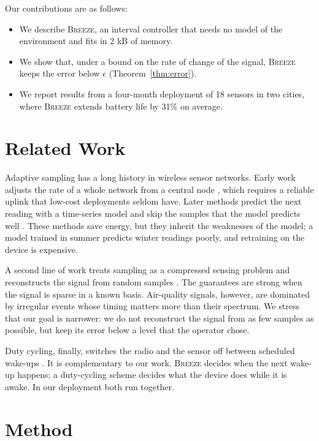 \documentclass{article}
\newcommand{\sys}{\textsc{Breeze}\xspace}
\begin{document}
Our contributions are as follows:
\begin{itemize}
  \item We describe \sys, an interval controller that needs no model of the environment and fits in
  2 kB of memory.
  \item We show that, under a bound on the rate of change of the signal, \sys keeps the error below
  $\epsilon$ (Theorem~\ref{thm:error}).
  \item We report results from a four-month deployment of 18 sensors in two cities, where \sys extends
  battery life by 31\% on average.
\end{itemize}

\section{Related Work}

Adaptive sampling has a long history in wireless sensor networks. Early work
adjusts the rate of a whole network from a central node
\citep{jain2004adaptive}, which requires a reliable uplink that low-cost
deployments seldom have. Later methods predict the next reading with a
time-series model and skip the samples that the model predicts well
\citep{alippi2010adaptive,silva2017adaptive}. These methods save energy, but
they inherit the weaknesses of the model; a model trained in summer predicts
winter readings poorly, and retraining on the device is expensive.

A second line of work treats sampling as a compressed sensing problem and
reconstructs the signal from random samples \citep{chen2012compressed}. The
guarantees are strong when the signal is sparse in a known basis.
Air-quality signals, however, are dominated by irregular events whose timing
matters more than their spectrum. We stress that our goal is narrower: we do
not reconstruct the signal from as few samples as possible, but keep its
error below a level that the operator chose.

Duty cycling, finally, switches the radio and the sensor off between
scheduled wake-ups \citep{anastasi2009energy}. It is complementary to our
work. \sys decides when the next wake-up happens; a duty-cycling scheme
decides what the device does while it is awake. In our deployment both run
together.

\section{Method}
\end{document}

